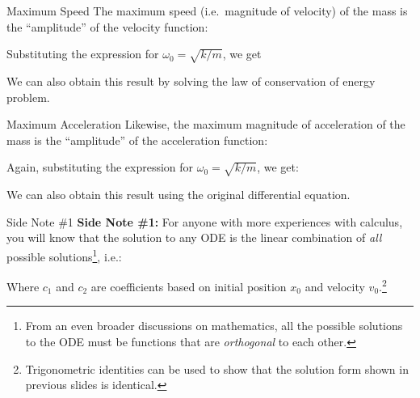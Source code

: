 \documentclass[12pt,compress,aspectratio=169]{beamer}
\begin{document}
\begin{frame}{Maximum Speed}
  The maximum speed (i.e.\ magnitude of velocity) of the mass is the
  ``amplitude'' of the velocity function:


  \vspace{-.05in}Substituting the expression for $\omega_0=\sqrt{k/m}$, we get
  

  We can also obtain this result by solving the law of conservation of energy
  problem. 
\end{frame}



\begin{frame}{Maximum Acceleration}
  Likewise, the maximum magnitude of acceleration of the mass is the
  ``amplitude'' of the acceleration function:


  \vspace{-.05in}Again, substituting the expression for $\omega_0=\sqrt{k/m}$,
  we get:
  

  We can also obtain this result using the original differential equation.
\end{frame}



\begin{frame}{Side Note \#1}
  \textbf{Side Note \#1:} For anyone with more experiences with calculus, you
  will know that the solution to any ODE is the linear combination of
  \emph{all} possible solutions\footnote{From an even broader discussions on
  mathematics, all the possible solutions to the ODE must be functions that are
  \emph{orthogonal} to each other.}, i.e.:


  \vspace{-.1in}Where $c_1$ and $c_2$ are coefficients based on initial
  position $x_0$ and velocity $v_0$.\footnote{Trigonometric identities can be
  used to show that the solution form shown in previous slides is identical.}
\end{frame}
\end{document}
